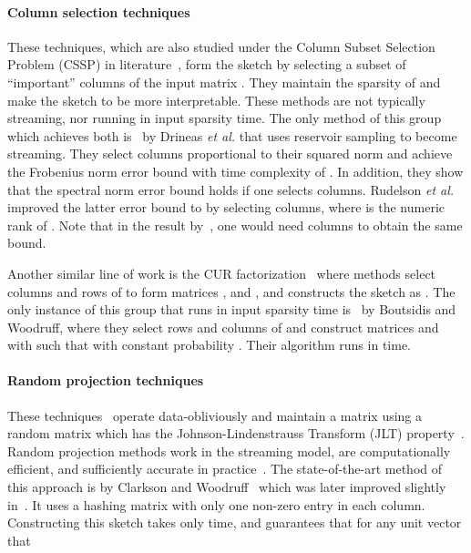 \documentclass[11pt]{article}
\newcommand{\etal}{\emph{et al.}\xspace}
\newcommand{\Paragraph}[1]{\paragraph*{\sffamily \textbf{#1}}}
\begin{document}
\Paragraph{Column selection techniques} 
These techniques, which are also studied under the Column Subset Selection Problem (CSSP) in literature~\cite{frieze2004fast,drineas2003pass,boutsidis2009improved,deshpande2006adaptive,drineas2011faster,boutsidis2011near}, form the sketch  by selecting a subset of ``important'' columns of the input matrix . They maintain the sparsity of  and make the sketch  to be more interpretable. These methods are not typically streaming, nor running in input sparsity time. The only method of this group which achieves both is~\cite{drineas2006fast2} by Drineas \etal that uses reservoir sampling to become streaming. 
They select  columns proportional to their squared norm and achieve the Frobenius norm error bound  with time complexity of .  
In addition, they show that the spectral norm error bound  holds if one selects  columns. Rudelson \etal~\cite{rudelson2007sampling} improved the latter error bound to  by selecting  columns, where  is the numeric rank of . Note that in the result by~\cite{drineas2006fast2}, one would need  columns to obtain the same bound.

Another similar line of work is the CUR factorization~\cite{boutsidis2014optimal,drineas2003pass,drineas2006fast,drineas2008relative,mahoney2009cur} where methods select  columns and  rows of  to form matrices ,  and , and constructs the sketch as . The only instance of this group that runs in input sparsity time is~\cite{boutsidis2014optimal} by Boutsidis and Woodruff, where they select  rows and columns of  and construct matrices  and  with  such that with constant probability . Their algorithm runs in  time.






\Paragraph{Random projection techniques} 
These techniques~\cite{papadimitriou1998latent,vempala2004random,sarlos2006improved,liberty2007randomized} operate data-obliviously and maintain a  matrix  using a  random matrix  which has the Johnson-Lindenstrauss Transform (JLT) property~\cite{matouvsek2008variants}.  
Random projection methods work in the streaming model, are computationally efficient, and sufficiently accurate in practice~\cite{desai2015improved}.
The state-of-the-art method of this approach is by Clarkson and Woodruff~\cite{clarkson2013low} which was later improved slightly in~\cite{NN13}. 
It uses a hashing matrix  with only one non-zero entry in each column.  Constructing this sketch takes only   time, and guarantees that for any unit vector  that 
\end{document}
